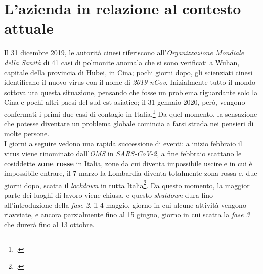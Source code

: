 
\section{L'azienda in relazione al contesto attuale}

Il 31 dicembre 2019, le autorità cinesi riferiscono all'\textit{Organizzazione Mondiale della Sanità} di 41 casi di polmonite anomala che si sono verificati a Wuhan, capitale della provincia di Hubei, in Cina; pochi giorni dopo, gli scienziati cinesi identificano il nuovo virus con il nome di \textit{2019-nCov}. Inizialmente tutto il mondo sottovaluta questa situazione, pensando che fosse un problema riguardante solo la Cina e pochi altri paesi del sud-est asiatico; il 31 gennaio 2020, però, vengono confermati i primi due casi di contagio in Italia.\footcite{sole24ore:cronistoria-covid} Da quel momento, la sensazione che potesse diventare un problema globale comincia a farsi strada nei pensieri di molte persone. \\
I giorni a seguire vedono una rapida successione di eventi: a inizio febbraio il virus viene rinominato dall'\textit{OMS} in \textit{SARS-CoV-2}, a fine febbraio scattano le cosiddette \textbf{zone rosse} in Italia, zone da cui diventa impossibile uscire e in cui è impossibile entrare, il 7 marzo la Lombardia diventa totalmente zona rossa e, due giorni dopo, scatta il \textit{lockdown} in tutta Italia\footcite{sole24ore:cronistoria-covid}. Da questo momento, la maggior parte dei luoghi di lavoro viene chiusa, e questo \textit{shutdown} dura fino all'introduzione della \textit{fase 2}, il 4 maggio, giorno in cui alcune attività vengono riavviate, e ancora parzialmente fino al 15 giugno, giorno in cui scatta la \textit{fase 3} che durerà fino al 13 ottobre. \\


